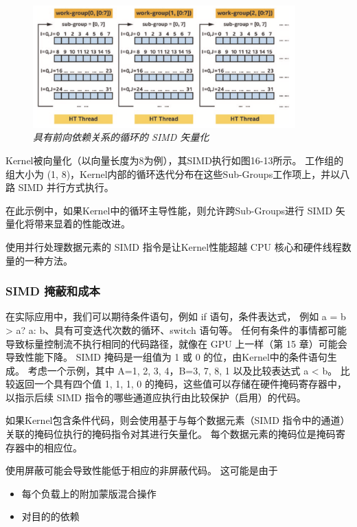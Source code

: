 \begin{figure}[H]
	\centering
	\includegraphics[width=0.9\textwidth]{figs/F16.13.png}
	\caption{\textit{具有前向依赖关系的循环的 SIMD 矢量化 }}
\end{figure}

Kernel被向量化（以向量长度为8为例），其SIMD执行如图16-13所示。 
工作组的组大小为 (1, 8)，Kernel内部的循环迭代分布在这些Sub-Groups工作项上，并以八路 SIMD 并行方式执行。

在此示例中，如果Kernel中的循环主导性能，则允许跨Sub-Groups进行 SIMD 矢量化将带来显着的性能改进。

使用并行处理数据元素的 SIMD 指令是让Kernel性能超越 CPU 核心和硬件线程数量的一种方法。

\subsubsection{SIMD 掩蔽和成本}
在实际应用中，我们可以期待条件语句，例如 if 语句，条件表达式，
例如 a = b > a? a: b、具有可变迭代次数的循环、switch 语句等。 
任何有条件的事情都可能导致标量控制流不执行相同的代码路径，就像在 GPU 上一样（第 15 章）可能会导致性能下降。 
SIMD 掩码是一组值为 1 或 0 的位，由Kernel中的条件语句生成。 
考虑一个示例，其中 A={1, 2, 3, 4}，B={3, 7, 8, 1} 以及比较表达式 a < b。 
比较返回一个具有四个值 {1, 1, 1, 0} 的掩码，这些值可以存储在硬件掩码寄存器中，
以指示后续 SIMD 指令的哪些通道应执行由比较保护（启用）的代码。

如果Kernel包含条件代码，则会使用基于与每个数据元素（SIMD 指令中的通道）关联的掩码位执行的掩码指令对其进行矢量化。 
每个数据元素的掩码位是掩码寄存器中的相应位。

使用屏蔽可能会导致性能低于相应的非屏蔽代码。 这可能是由于

\begin{itemize}
	\item 每个负载上的附加蒙版混合操作

	\item 对目的的依赖
\end{itemize}

